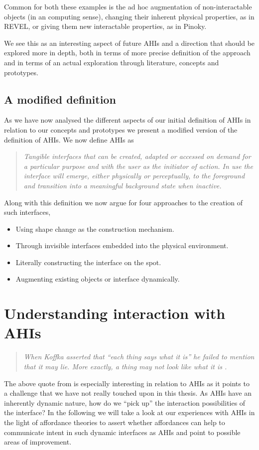 Common for both these examples is the ad hoc augmentation of non-interactable objects (in an computing sense), changing their inherent physical properties, as in REVEL, or giving them new interactable properties, as in Pinoky.

We see this as an interesting aspect of future AHIs and a direction that should be explored more in depth, both in terms of more precise definition of the approach and in terms of an actual exploration through literature, concepts and prototypes.

\subsection{A modified definition}
As we have now analysed the different aspects of our initial definition of AHIs in relation to our concepts and prototypes we present a modified version of the definition of AHIs.
We now define AHIs as
\begin{quotation}
\emph{Tangible interfaces that can be created, adapted or accessed on demand for a particular purpose and with the user as the initiator of action. In use the interface will emerge, either physically or perceptually, to the foreground and transition into a meaningful background state when inactive.}
\end{quotation}

Along with this definition we now argue for four approaches to the creation of such interfaces,

\begin{itemize}
	\item{Using shape change as the construction mechanism.}
	\item{Through invisible interfaces embedded into the physical environment.}
	\item{Literally constructing the interface on the spot.}
	\item{Augmenting existing objects or interface dynamically.}
\end{itemize} 

\section{Understanding interaction with AHIs}
\begin{quotation}
\emph{When Koffka asserted that ``each thing says what it is'' he failed to mention that it may lie. More exactly, a thing may not look like what it is \citep{gibson1979ecological}.}
\end{quotation}
The above quote from \citeauthor{gibson1979ecological} is especially interesting in relation to AHIs as it points to a challenge that we have not really touched upon in this thesis.
As AHIs have an inherently dynamic nature, how do we ``pick up'' the interaction possibilities of the interface? 
In the following we will take a look at our experiences with AHIs in the light of affordance theories to assert whether affordances can help to communicate intent in such dynamic interfaces as AHIs and point to possible areas of improvement.

